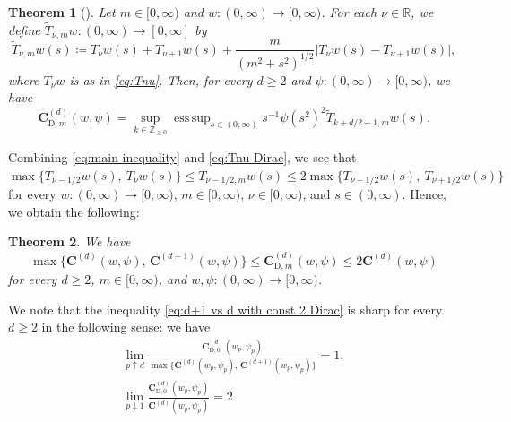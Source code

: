 \documentclass[reqno,letterpaper]{amsart}
\numberwithin{equation}{section}
\theoremstyle{plain}
\newtheorem{theorem}{Theorem}[section]
\newcommand{\R}{\mathbb{R}}
\newcommand{\Z}{\mathbb{Z}}
\newcommand{\abs}[1]{\lvert#1\rvert}
\newcommand{\Tnu}[1]{T_{#1}}
\newcommand{\TnumDirac}[2]{\widetilde{T}_{#1, #2}}
\DeclareMathOperator*{\esssup}{ess\,sup}
\newcommand{\Const}{\bm{C}}
\newcommand{\Constwpd}[3]{\Const^{(#3)}(#1, #2)}
\newcommand{\ConstwpdDirac}[4]{\Const_{\textrm{D}, #4}^{(#3)}(#1, #2)}
\newcommand{\intervaloo}[2]{(#1, #2)}
\newcommand{\intervalco}[2]{[#1, #2)}
\newcommand{\intervalcc}[2]{[#1, #2]}
\begin{document}
\begin{theorem}[{\cite[Theorem 1.5]{Suz2025}}]
	Let $m \in \intervalco{0}{\infty}$ and $w \colon \intervaloo{0}{\infty} \to \intervalco{0}{\infty}$.
	For each $\nu \in \R$, we define $\TnumDirac{\nu}{m} w \colon \intervaloo{0}{\infty} \to \intervalcc{0}{\infty}$ by
	\begin{equation} \label{eq:Tnu Dirac}
	\TnumDirac{\nu}{m}w(s) \coloneqq \Tnu{\nu}w(s) + \Tnu{\nu+1}w(s) + \frac{m}{(m^2+s^2)^{1/2}} \abs{ \Tnu{\nu}w(s) - \Tnu{\nu+1}w(s) } ,
	\end{equation}
	where $\Tnu{\nu} w$ is as in \eqref{eq:Tnu}. 
	Then, for every $d \geq 2$ and $\psi \colon \intervaloo{0}{\infty} \to \intervalco{0}{\infty}$, we have
	\begin{equation} \label{eq:Walther Dirac}
		\ConstwpdDirac{w}{\psi}{d}{m} = \sup_{k \in \Z_{\geq 0}} \esssup_{s \in \intervaloo{0}{\infty}} s^{-1} \psi(s^2)^2 \TnumDirac{k+d/2-1}{m}w(s) .
	\end{equation}
\end{theorem}
Combining \eqref{eq:main inequality} and \eqref{eq:Tnu Dirac}, we see that
\begin{equation}
\max\{ \Tnu{\nu-1/2}w(s),\ \Tnu{\nu}w(s) \} \leq \TnumDirac{\nu-1/2}{m}w(s) \leq 2 \max\{ \Tnu{\nu-1/2}w(s),\ \Tnu{\nu+1/2}w(s) \} 
\end{equation}
for every $w \colon \intervaloo{0}{\infty} \to \intervalco{0}{\infty}$, $m \in \intervalco{0}{\infty}$, $\nu \in \intervalco{0}{\infty}$, and $s \in \intervaloo{0}{\infty}$.
Hence, we obtain the following:
\begin{theorem} \label{thm:dimension-comparison}
	We have
	\begin{equation} \label{eq:d+1 vs d with const 2 Dirac}
	\max\{ \Constwpd{w}{\psi}{d}, \, \Constwpd{w}{\psi}{d+1} \} \leq \ConstwpdDirac{w}{\psi}{d}{m} \leq 2 \Constwpd{w}{\psi}{d} 
	\end{equation}
	for every $d \geq 2$, $m \in \intervalco{0}{\infty}$, and $w, \psi \colon \intervaloo{0}{\infty} \to \intervalco{0}{\infty}$.
\end{theorem}
We note that the inequality \eqref{eq:d+1 vs d with const 2 Dirac} is sharp for every $d \geq 2$ in the following sense: we have
\begin{gather}
\lim_{p \uparrow d} \frac{\ConstwpdDirac{ w_p }{ \psi_p }{d}{0}}{ \max\{ \Constwpd{ w_p }{ \psi_p }{d}, \, \Constwpd{ w_p }{ \psi_p }{d+1} \} } = 1 , \\
\lim_{p \downarrow 1} \frac{\ConstwpdDirac{ w_p }{ \psi_p }{d}{0}}{ \Constwpd{w_p}{\psi_p}{d} } = 2
\end{gather}
\end{document}
